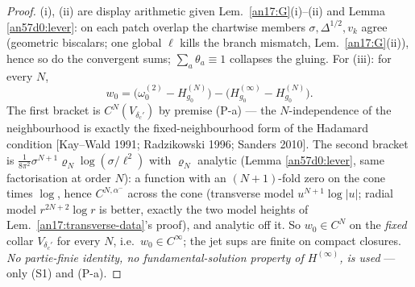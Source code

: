 \begin{proof}
(i), (ii) are display arithmetic given Lem.~\ref{an17:G}(i)--(ii) and Lemma
\ref{an57d0:lever}: on each patch overlap the chartwise members
$\sigma,\Delta^{1/2},v_k$ agree (geometric biscalars; one global $\ell$
kills the branch mismatch, Lem.~\ref{an17:G}(ii)), hence so do the convergent sums;
$\sum_a\theta_a\equiv1$ collapses the gluing. For (iii): for every $N$,
\[
 w_0=\bigl(\omega^{(2)}_0-H^{(N)}_{g_0}\bigr)
 -\bigl(H^{(\infty)}_{g_0}-H^{(N)}_{g_0}\bigr).
\]
The first bracket is $C^N(V_{\delta_c'})$ by premise (P-a) --- the
$N$-independence of the neighbourhood is exactly the fixed-neighbourhood
form of the Hadamard condition [Kay--Wald 1991; Radzikowski 1996; Sanders
2010]. The second bracket is $\frac1{8\pi^2}\sigma^{N+1}\varrho_N
\log(\sigma/\ell^2)$ with $\varrho_N$ analytic (Lemma \ref{an57d0:lever},
same factorisation at order $N$): a function with an $(N{+}1)$-fold zero on
the cone times $\log$, hence $C^{N,\alpha^-}$ across the cone (transverse
model $u^{N+1}\log|u|$; radial model $r^{2N+2}\log r$ is better, exactly
the two model heights of Lem.\ \ref{an17:transverse-data}'s proof), and analytic
off it. So $w_0\in C^N$ on the \emph{fixed} collar $V_{\delta_c'}$ for
every $N$, i.e.\ $w_0\in C^\infty$; the jet sups are finite on compact
closures. \emph{No partie-finie identity, no fundamental-solution property
of $H^{(\infty)}$, is used} --- only (S1) and (P-a).
\end{proof}

